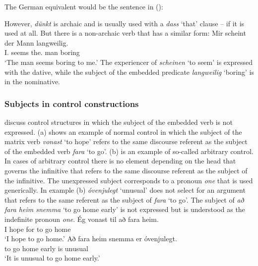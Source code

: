 \noindent
The German equivalent would be the sentence in ():
{
\z}

\noindent
However, \emph{dünkt} is archaic and is usually used with a \emph{dass} `that' clause -- if it is used at
all. But there is a non-archaic verb that has a similar form:
\ea
\gll Mir scheint der Mann langweilig.\\
     I.\DAT{} seems the.\NOM{} man boring\\\german
\glt `The man seems boring to me.'
\z
The experiencer of \emph{scheinen} `to seem' is expressed with the dative, while the subject of the
embedded predicate \emph{langweilig} `boring' is in the nominative.



\subsubsection{Subjects in control constructions}
\label{sec-subject-control}

\citet*[Section~2.7]{ZMT85a} discuss control structures in which the subject of the embedded verb is
not expressed. (a) shows an example of normal control in which the subject of the matrix verb
\emph{vonast} `to hope' refers to the same discourse referent as the subject of the embedded verb \emph{fara} `to
go'. (b) is an example of so-called arbitrary control. In cases of arbitrary control there is
no element depending on the head that governs the infinitive that refers to the same discourse
referent as the subject of the infinitive. The unexpressed subject corresponds to a pronoun \emph{one} that is
used generically. In example (b) \emph{óvenjulegt} `unusual' does not select for an argument
that refers to the same referent as the subject of \emph{fara} `to go'. The subject of \emph{að fara
  heim snemma} `to go home early' is not expressed but is understood as the indefinite pronoun \emph{one}.
\eal
\ex
\gll Ég  vonast til að fara heim.\\
     I   hope   for to go   home\\\icelandic
\glt `I hope to go home.'
\ex
\gll Að fara heim snemma er óvenjulegt.\\
     to go home   early is unusual\\
\glt `It is unusual to go home early.'
\zl

